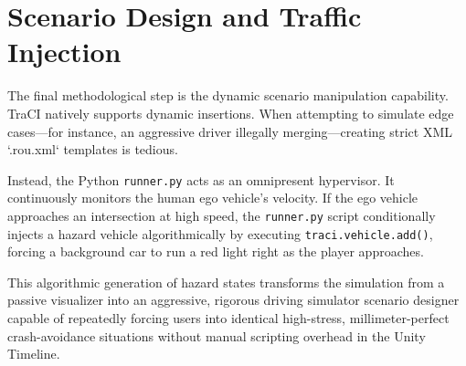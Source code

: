 \section{Scenario Design and Traffic Injection}

The final methodological step is the dynamic scenario manipulation capability. TraCI natively supports dynamic insertions. When attempting to simulate edge cases—for instance, an aggressive driver illegally merging—creating strict XML `.rou.xml` templates is tedious. 

Instead, the Python \texttt{runner.py} acts as an omnipresent hypervisor. It continuously monitors the human ego vehicle's velocity. If the ego vehicle approaches an intersection at high speed, the \texttt{runner.py} script conditionally injects a hazard vehicle algorithmically by executing \texttt{traci.vehicle.add()}, forcing a background car to run a red light right as the player approaches. 

This algorithmic generation of hazard states transforms the simulation from a passive visualizer into an aggressive, rigorous driving simulator scenario designer capable of repeatedly forcing users into identical high-stress, millimeter-perfect crash-avoidance situations without manual scripting overhead in the Unity Timeline.
